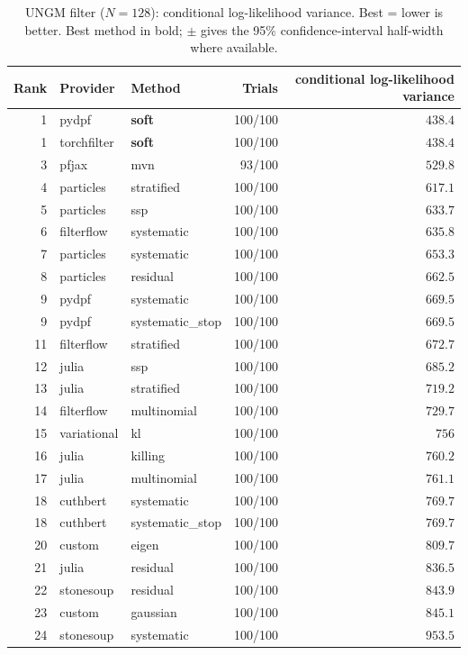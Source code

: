 \begin{table}[!htbp]
\centering
\small
\caption{UNGM filter ($N=128$): conditional log-likelihood variance. Best = lower is better. Best method in bold; $\pm$ gives the 95\% confidence-interval half-width where available.}
\label{tab:ungm-filter-conditional-loglik-variance}
\begin{tabular}{rllrr}
\toprule
Rank & Provider & Method & Trials & conditional log-likelihood variance \\
\midrule
1 & pydpf & \textbf{soft} & 100/100 & $\mathbf{438.4}$ \\
1 & torchfilter & \textbf{soft} & 100/100 & $\mathbf{438.4}$ \\
3 & pfjax & mvn & 93/100 & $529.8$ \\
4 & particles & stratified & 100/100 & $617.1$ \\
5 & particles & ssp & 100/100 & $633.7$ \\
6 & filterflow & systematic & 100/100 & $635.8$ \\
7 & particles & systematic & 100/100 & $653.3$ \\
8 & particles & residual & 100/100 & $662.5$ \\
9 & pydpf & systematic & 100/100 & $669.5$ \\
9 & pydpf & systematic\_stop & 100/100 & $669.5$ \\
11 & filterflow & stratified & 100/100 & $672.7$ \\
12 & julia & ssp & 100/100 & $685.2$ \\
13 & julia & stratified & 100/100 & $719.2$ \\
14 & filterflow & multinomial & 100/100 & $729.7$ \\
15 & variational & kl & 100/100 & $756$ \\
16 & julia & killing & 100/100 & $760.2$ \\
17 & julia & multinomial & 100/100 & $761.1$ \\
18 & cuthbert & systematic & 100/100 & $769.7$ \\
18 & cuthbert & systematic\_stop & 100/100 & $769.7$ \\
20 & custom & eigen & 100/100 & $809.7$ \\
21 & julia & residual & 100/100 & $836.5$ \\
22 & stonesoup & residual & 100/100 & $843.9$ \\
23 & custom & gaussian & 100/100 & $845.1$ \\
24 & stonesoup & systematic & 100/100 & $953.5$ \\

\end{tabular}
\end{table}
